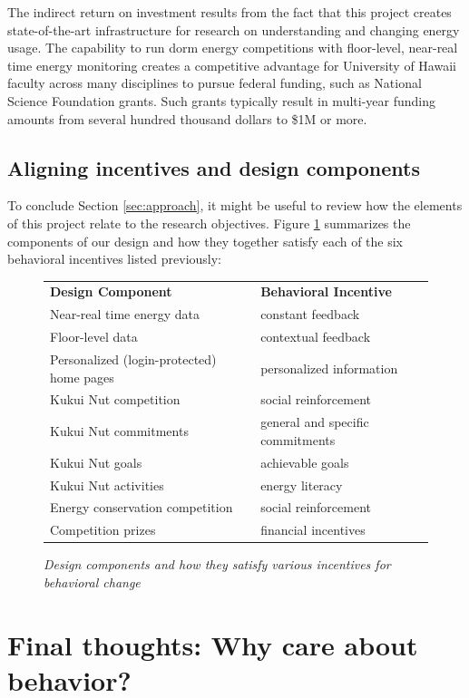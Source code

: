 \documentclass[11pt]{article}
\begin{document}
The indirect return on investment results from the fact that this project
creates state-of-the-art infrastructure for research on understanding and
changing energy usage.  The capability to run dorm energy competitions with
floor-level, near-real time energy monitoring creates a competitive
advantage for University of Hawaii faculty across many disciplines to
pursue federal funding, such as National Science Foundation grants.  Such
grants typically result in multi-year funding amounts from several hundred
thousand dollars to \$1M or more.


\subsection{Aligning incentives and design components}

To conclude Section \ref{sec:approach}, it might be useful to review how the
elements of this project relate to the research objectives.  Figure
\ref{fig:incentives} summarizes the components of our design and how they
together satisfy each of the six behavioral incentives listed previously:

\begin{figure}[!ht]
\small
\begin{tabular}{p{3in}p{3in}} \hline
{\bf Design Component} & {\bf Behavioral Incentive}  \\
Near-real time energy data & constant feedback \\
Floor-level data & contextual feedback  \\
Personalized (login-protected) home pages  & personalized information \\
Kukui Nut competition & social reinforcement \\ 
Kukui Nut commitments & general and specific commitments \\
Kukui Nut goals & achievable goals \\ 
Kukui Nut activities & energy literacy \\ 
Energy conservation competition & social reinforcement \\
Competition prizes & financial incentives  \\ \hline
\end{tabular}
\normalsize
\caption{{\em Design components and how they satisfy various incentives for behavioral change}}
\label{fig:incentives}
\end{figure}

\section{Final thoughts: Why care about behavior?}
\end{document}

